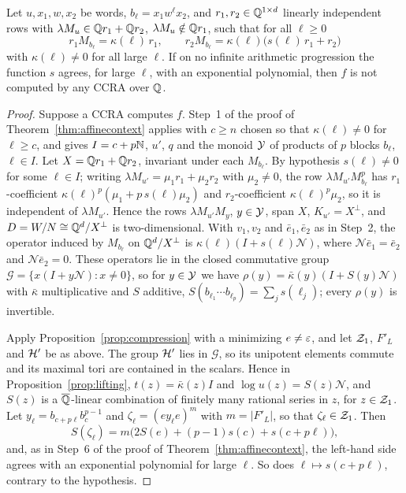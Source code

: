 \begin{theorem}\label{thm:unipotentcontext}
Let $u,x_1,w,x_2$ be words, $b_\ell=x_1w^\ell x_2$, and $r_1,r_2\in\mathbb{Q}^{1\times d}$ linearly independent rows with $\lambda M_u\in\mathbb{Q} r_1+\mathbb{Q} r_2$, $\lambda M_u\notin\mathbb{Q} r_1$, such that for all $\ell\ge0$
\[
r_1M_{b_\ell}=\kappa(\ell)\,r_1,\qquad r_2M_{b_\ell}=\kappa(\ell)\bigl(s(\ell)\,r_1+r_2\bigr)
\]
with $\kappa(\ell)\ne0$ for all large $\ell$. If on no infinite arithmetic progression the function $s$ agrees, for large $\ell$, with an exponential polynomial, then $f$ is not computed by any CCRA over $\mathbb{Q}$.
\end{theorem}
\begin{proof}
Suppose a CCRA computes $f$. Step~1 of the proof of Theorem~\ref{thm:affinecontext} applies with $c\ge n$ chosen so that $\kappa(\ell)\ne0$ for $\ell\ge c$, and gives $I=c+p\mathbb{N}$, $u'$, $q$ and the monoid $\mathcal{Y}$ of products of $p$ blocks $b_\ell$, $\ell\in I$. Let $X=\mathbb{Q} r_1+\mathbb{Q} r_2$, invariant under each $M_{b_\ell}$. By hypothesis $s(\ell)\ne0$ for some $\ell\in I$; writing $\lambda M_{u'}=\mu_1r_1+\mu_2r_2$ with $\mu_2\ne0$, the row $\lambda M_{u'}M_{b_\ell}^p$ has $r_1$-coefficient $\kappa(\ell)^p(\mu_1+p\,s(\ell)\mu_2)$ and $r_2$-coefficient $\kappa(\ell)^p\mu_2$, so it is independent of $\lambda M_{u'}$. Hence the rows $\lambda M_{u'}M_y$, $y\in\mathcal{Y}$, span $X$, $K_{u'}=X^\perp$, and $D=W/N\cong\mathbb{Q}^d/X^\perp$ is two-dimensional. With $v_1,v_2$ and $\bar e_1,\bar e_2$ as in Step~2, the operator induced by $M_{b_\ell}$ on $\mathbb{Q}^d/X^\perp$ is $\kappa(\ell)(I+s(\ell)\mathcal N)$, where $\mathcal N\bar e_1=\bar e_2$ and $\mathcal N\bar e_2=0$. These operators lie in the closed commutative group $\mathcal G=\{x(I+y\mathcal N):x\ne0\}$, so for $y\in\mathcal{Y}$ we have $\rho(y)=\bar\kappa(y)(I+S(y)\mathcal N)$ with $\bar\kappa$ multiplicative and $S$ additive, $S(b_{\ell_1}\cdots b_{\ell_p})=\sum_js(\ell_j)$; every $\rho(y)$ is invertible.

Apply Proposition~\ref{prop:compression} with a minimizing $e\ne\varepsilon$, and let $\mathcal{Z}_1$, $F'_L$ and $\mathcal{H}'$ be as above. The group $\mathcal{H}'$ lies in $\mathcal G$, so its unipotent elements commute and its maximal tori are contained in the scalars. Hence in Proposition~\ref{prop:lifting}, $t(z)=\bar\kappa(z)I$ and $\log u(z)=S(z)\mathcal N$, and $S(z)$ is a $\overline{\mathbb{Q}}$-linear combination of finitely many rational series in $z$, for $z\in\mathcal{Z}_1$. Let $y_\ell=b_{c+p\ell}b_c^{p-1}$ and $\zeta_\ell=(ey_\ell e)^{m}$ with $m=|F'_L|$, so that $\zeta_\ell\in\mathcal{Z}_1$. Then
\[
S(\zeta_\ell)=m\bigl(2S(e)+(p-1)s(c)+s(c+p\ell)\bigr),
\]
and, as in Step~6 of the proof of Theorem~\ref{thm:affinecontext}, the left-hand side agrees with an exponential polynomial for large $\ell$. So does $\ell\mapsto s(c+p\ell)$, contrary to the hypothesis.
\end{proof}

